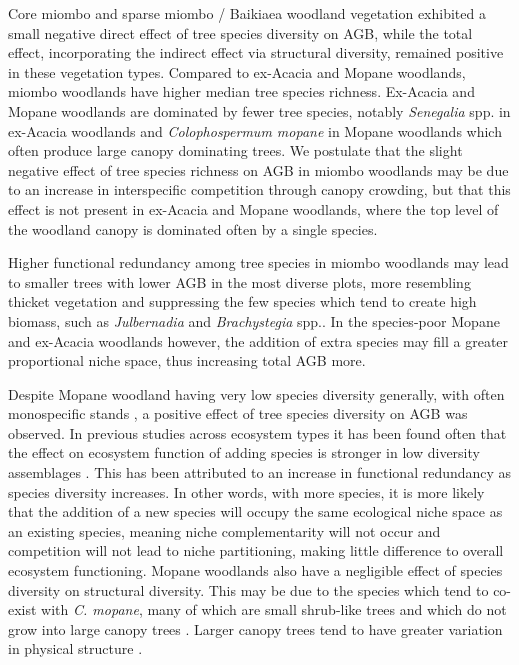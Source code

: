 \documentclass[11pt,a4paper]{article}
\begin{document}
Core miombo and sparse miombo / Baikiaea woodland vegetation exhibited a small negative direct effect of tree species diversity on AGB, while the total effect, incorporating the indirect effect via structural diversity, remained positive in these vegetation types. Compared to ex-Acacia and Mopane woodlands, miombo woodlands have higher median tree species richness. Ex-Acacia and Mopane woodlands are dominated by fewer tree species, notably \textit{Senegalia} spp. in ex-Acacia woodlands and \textit{Colophospermum mopane} in Mopane woodlands which often produce large canopy dominating trees. We postulate that the slight negative effect of tree species richness on AGB in miombo woodlands may be due to an increase in interspecific competition through canopy crowding, but that this effect is not present in ex-Acacia and Mopane woodlands, where the top level of the woodland canopy is dominated often by a single species. 

Higher functional redundancy among tree species in miombo woodlands may lead to smaller trees with lower AGB in the most diverse plots, more resembling thicket vegetation and suppressing the few species which tend to create high biomass, such as \textit{Julbernadia} and \textit{Brachystegia} spp.. In the species-poor Mopane and ex-Acacia woodlands however, the addition of extra species may fill a greater proportional niche space, thus increasing total AGB more. 

Despite Mopane woodland having very low species diversity generally, with often monospecific stands \citep{Timberlake2010}, a positive effect of tree species diversity on AGB was observed. In previous studies across ecosystem types it has been found often that the effect on ecosystem function of adding species is stronger in low diversity assemblages \citep{Hector2007}. This has been attributed to an increase in functional redundancy as species diversity increases. In other words, with more species, it is more likely that the addition of a new species will occupy the same ecological niche space as an existing species, meaning niche complementarity will not occur and competition will not lead to niche partitioning, making little difference to overall ecosystem functioning. Mopane woodlands also have a negligible effect of species diversity on structural diversity. This may be due to the species which tend to co-exist with \textit{C. mopane}, many of which are small shrub-like trees and which do not grow into large canopy trees \citep{Timberlake2010}. Larger canopy trees tend to have greater variation in physical structure \citep{Seidel2019}. 
\end{document}
